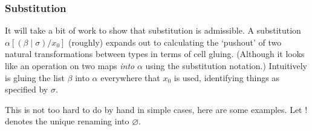 \documentclass[10pt]{article}
\let\emptyset\varnothing
\newcommand{\yields}{\vdash}
\newcommand{\type}{\,\,\mathsf{type}}
\begin{document}

\subsubsection{Substitution}

It will take a bit of work to show that substitution is admissible. A substitution $\alpha[(\beta \mid \sigma) / x_0]$ (roughly) expands out to calculating the `pushout' of two natural transformations between types in terms of cell gluing. (Although it looks like an operation on two maps \emph{into} $\alpha$ using the substitution notation.) Intuitively is gluing the list $\beta$ into $\alpha$ everywhere that $x_0$ is used, identifying things as specified by $\sigma$.

This is not too hard to do by hand in simple cases, here are some examples. Let $!$ denotes the unique renaming into $\emptyset$. 
\end{document}
